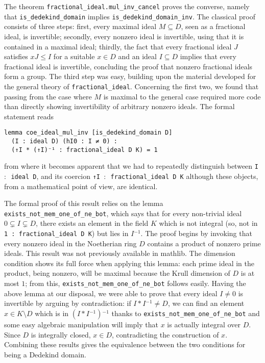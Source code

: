 \documentclass[sn-mathphys]{sn-jnl}%
\newcommand{\inv}{\ensuremath{{}^{-1}}}
\newcommand{\lean}[1]{\texttt{#1}\xspace}
\newcommand{\mathlib}{\textsf{mathlib}\xspace}
\begin{document}
The theorem \lean{fractional\_ideal.mul\_inv\_cancel} proves the converse, namely that \lean{is\_dedekind\_domain} implies \lean{is\_dedekind\_domain\_inv}. The classical proof consists of three steps: first, every maximal ideal $M\subseteq D$, seen as a fractional ideal, is invertible;
secondly, every nonzero ideal is invertible, using that it is contained in a maximal ideal;
thirdly, the fact that every fractional ideal $J$ satisfies $xJ\leq I$ for a suitable $x\in D$ and an ideal $I\subseteq D$ implies that every fractional ideal is invertible, concluding the proof that nonzero fractional ideals form a group.
The third step was easy, building upon the material developed for the general theory of \lean{fractional\_ideal}. Concerning the first two, we found that passing from the case where $M$ is maximal to the general case required more code than directly showing invertibility of arbitrary nonzero ideals. The formal statement reads
\begin{lstlisting}
lemma coe_ideal_mul_inv [is_dedekind_domain D] 
  (I : ideal D) (hI0 : I ≠ 0) :
  (↑I * (↑I)⁻¹ : fractional_ideal D K) = 1
\end{lstlisting}
from where it becomes apparent that we had to repeatedly distinguish between \lean{I $:$ ideal D}, and its coercion \lean{↑I $:$ fractional\_ideal D K} although these objects, from a mathematical point of view, are identical.

The formal proof of this result relies on the lemma \lean{exists\_not\_mem\_one\-\_of\-\_ne\-\_bot}, which says that for every non-trivial ideal $0\subsetneq I\subsetneq D$, there exists an element in the field $K$ which is not integral (so, not in \lean{1 : fractional\_ideal D K}) but lies in $I\inv$. The proof begins by invoking that every nonzero ideal in the Noetherian ring $D$ contains a product of nonzero prime ideals. This result was not previously available in \mathlib.
The dimension condition shows its full force when applying this lemma:
each prime ideal in the product, being nonzero, will be maximal because the Krull dimension of $D$ is at most $1$; from this, \lean{exists\_not\_mem\_one\_of\_ne\_bot} follows easily. Having the above lemma at our disposal,
we were able to prove that every ideal $I\ne 0$ is invertible by arguing by contradiction: if $I\ast I\inv \ne D$, we can find an element $x\in K\setminus D$ which is in $(I\ast I\inv)\inv$ thanks to \lean{exists\_not\_mem\_one\_of\_ne\_bot} and some easy algebraic manipulation will imply that $x$ is actually integral over $D$. Since $D$ is integrally closed, $x \in D$, contradicting the construction of $x$. Combining these results gives the equivalence between the two conditions for being a Dedekind domain.
\end{document}

